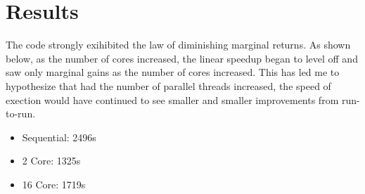 \documentclass[11pt]{article}
\begin{document}
\section{Results}
The code strongly exihibited the law of diminishing marginal returns. As shown below, as the number of cores increased, the linear speedup began to level off and saw only marginal gains as the number of cores increased. This has led me to hypothesize that had the number of parallel threads increased, the speed of exection would have continued to see smaller and smaller improvements from run-to-run.

\begin{itemize}
  \item Sequential: 2496s
  \item 2 Core: 1325s
  \item 16 Core: 1719s
\end{itemize}
\end{document}
